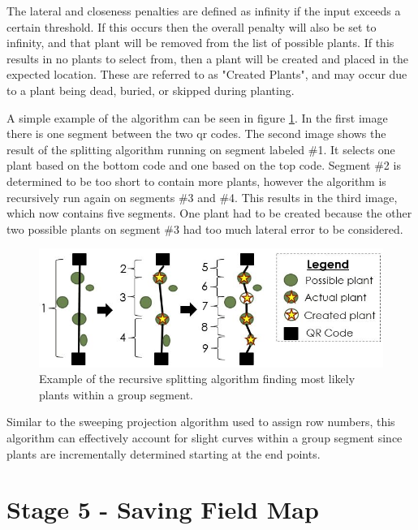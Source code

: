 The lateral and closeness penalties are defined as infinity if the input exceeds a certain threshold.  If this occurs then the overall penalty will also be set to infinity, and that plant will be removed from the list of possible plants.  If this results in no plants to select from, then a plant will be created and placed in the expected location.  These are referred to as "Created Plants", and may occur due to a plant being dead, buried, or skipped during planting.  

A simple example of the algorithm can be seen in figure \ref{figure:recursive_algorithm}.  In the first image there is one segment between the two \ac{qr} codes.  The second image shows the result of the splitting algorithm running on segment labeled \#1. It selects one plant based on the bottom code and one based on the top code.  Segment \#2 is determined to be too short to contain more plants, however the algorithm is recursively run again on segments \#3 and \#4.  This results in the third image, which now contains five segments.  One plant had to be created because the other two possible plants on segment \#3 had too much lateral error to be considered.   

\begin{figure}
	\centering
    \includegraphics[width=5in]{figures/recursive_algorithm2.jpg}
    \caption[Recursive splitting algorithm]{Example of the recursive splitting algorithm finding most likely plants within a group segment.}
    \label{figure:recursive_algorithm}
\end{figure}

Similar to the sweeping projection algorithm used to assign row numbers, this algorithm can effectively account for slight curves within a group segment since plants are incrementally determined starting at the end points. 

\section{Stage 5 - Saving Field Map}
\label{processing-stage5}

